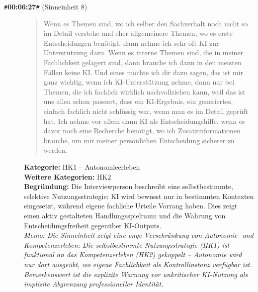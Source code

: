 \begin{description}
  \item[\texttt{\#}\textbf{00:06:27}\texttt{\#} (Sinneinheit 8)]
  \begin{quote}
  Wenn es Themen sind, wo ich selber den Sachverhalt noch nicht so im Detail verstehe und eher allgemeinere Themen, wo es erste Entscheidungen benötigt, dann nehme ich sehr oft KI zur Unterstützung dazu. Wenn es interne Themen sind, die in meiner Fachlichkeit gelagert sind, dann brauche ich dann in den meisten Fällen keine KI. Und eines möchte ich dir dazu sagen, das ist mir ganz wichtig, wenn ich KI-Unterstützung nehme, dann nur bei Themen, die ich fachlich wirklich nachvollziehen kann, weil das ist uns allen schon passiert, dass ein KI-Ergebnis, ein generiertes, einfach fachlich nicht schlüssig war, wenn man es im Detail geprüft hat. Ich nehme vor allem dann KI als Entscheidungshilfe, wenn es davor noch eine Recherche benötigt, wo ich Zusatzinformationen brauche, um mir meiner persönlichen Entscheidung sicherer zu werden.
  \end{quote}
  \textbf{Kategorie:} HK1 -- Autonomieerleben\\
  \textbf{Weitere Kategorien:} HK2\\
  \textbf{Begr\"undung:} Die Interviewperson beschreibt eine selbstbestimmte, selektive Nutzungsstrategie: KI wird bewusst nur in bestimmten Kontexten eingesetzt, während eigene fachliche Urteile Vorrang haben. Dies zeigt einen aktiv gestalteten Handlungsspielraum und die Wahrung von Entscheidungsfreiheit gegenüber KI-Outputs.
  \\\textit{Memo: Die Sinneinheit zeigt eine enge Verschränkung von Autonomie- und Kompetenzerleben: Die selbstbestimmte Nutzungsstrategie (HK1) ist funktional an das Kompetenzerleben (HK2) gekoppelt – Autonomie wird nur dort ausgeübt, wo eigene Fachlichkeit als Kontrollinstanz verfügbar ist. Bemerkenswert ist die explizite Warnung vor unkritischer KI-Nutzung als implizite Abgrenzung professioneller Identität.}
\end{description}
\medskip

